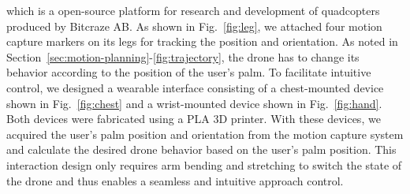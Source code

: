 which is a open-source platform for research and development of quadcopters produced by Bitcraze AB. 
As shown in Fig.~\ref{fig:leg}, we attached four motion capture markers on its legs for tracking the position and orientation. 
As noted in Section~\ref{sec:motion-planning}-\ref{fig:trajectory}, the drone has to change its behavior according to the position of the user's palm.
To facilitate intuitive control, we designed a wearable interface consisting of 
a chest-mounted device shown in Fig.~\ref{fig:chest} and 
a wrist-mounted device shown in Fig.~\ref{fig:hand}.
Both devices were fabricated using a PLA 3D printer. 
With these devices, we acquired the user's palm position and orientation from the motion capture system and calculate the desired drone behavior based on the user's palm position. 
This interaction design only requires arm bending and stretching to switch the state of the drone and thus enables a seamless and intuitive approach control.
